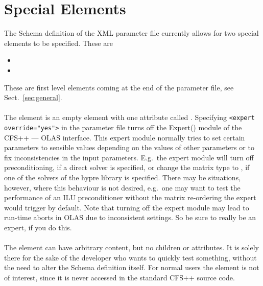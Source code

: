 \chapter{Special Elements}
%
%
The Schema definition of the XML parameter file currently allows for two
special elements to be specified. These are
%
%
\begin{itemize}
\item {}
\item {}
\end{itemize}
%
%
These are first level elements coming at the end of the parameter file, see
Sect.~\ref{sec:general}.
%
%
\subsubsection*{}
%
%
The  element is an empty element with one attribute called
. Specifying \verb+<expert override="yes">+ in the parameter file
turns off the Expert() module of the CFS++ --- OLAS interface. This expert
module normally tries to set certain
parameters to sensible values depending on the values of other parameters or
to fix inconsistencies in the input parameters. E.g.~the expert module will
turn off preconditioning, if a direct solver is specified, or change the
matrix type to , if one of the solvers of the hypre library
is specified. There may be situations, however, where this behaviour is not
desired, e.g.~one may want to test the performance of an ILU preconditioner
without the  matrix re-ordering the expert would trigger by default.
Note that turning off the expert module may lead to run-time aborts in OLAS due
to inconsistent settings. So be sure to really be an expert, if you do this.
%
%
\subsubsection*{}
%
%
The  element can have arbitrary content, but no children or
attributes. It is solely there for the sake of the developer who wants to
quickly test something, without the need to alter the Schema definition itself.
For normal users the element is not of interest, since it is never accessed
in the standard CFS++ source code.
